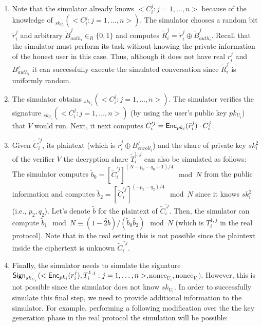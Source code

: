 \documentclass[journal]{IEEEtran}
\begin{document}
\begin{enumerate}

\item Note that the simulator already knows $<C_i^j:j=1,\ldots,n>$ because of the knowledge of $_{sk_{U_i}}(<C_i^j:j=1,\ldots,n>)$. The simulator chooses a random bit $\tilde{r}_i^j$ and arbitrary $\tilde{B}^j_{auth_i}  \in_R \{0,1\}$ and computes $\tilde{R}_i^j = \tilde{r}_i^j \oplus \tilde{B}^j_{auth_i}$. Recall that the simulator must perform its task without knowing the private information of the honest user in this case. Thus, although it does not have real $r_i^j$ and $B^j_{auth_i}$ it can successfully execute the simulated conversation since $\tilde{R}_i^j$ is uniformly random.

\item The simulator obtains $_{sk_{U_i}}(<C_i^j:j=1,\ldots,n>)$. The simulator verifies the signature $_{sk_{U_i}}(<C_i^j:j=1,\ldots,n>)$ (by using the user's public key $pk_{U_i}$) that $V$ would run. Next, it next computes $\tilde{C}^{\prime j}_{i} = \text{\sf Enc}_{pk_i}(\tilde{r}_i^j) \cdot C_i^j$. 

\item Given $\tilde{C}^{\prime j}_{i}$, its plaintext (which is $\tilde{r}_i^j \oplus B^j_{enroll_i}$) and the share of private key $sk_i^2$ of the verifier $V$ the decryption share $\tilde{T}_i^{1,j}$ can also be simulated as follows: The simulator computes $\tilde{b}_0= [\tilde{C}^{\prime j}_{i}]^{{(N -p_0 -q_0 +1)}/4} \mod N$ from the public information and computes $\tilde{b}_2 = [\tilde{C}^{\prime j}_{i}]^{{(-p_2-q_2)}/4} \mod N$ since it knows $sk_i^2$ (i.e., $p_2, q_2$). Let's denote $\tilde{b}$ for the plaintext of $\tilde{C}^{\prime j}_{i}$. Then, the simulator can compute $\tilde{b}_1 \mod N \equiv (1- \tilde{2b})/(\tilde{b}_0 \tilde{b_2}) \mod N$ (which is $T_i^{1,j}$ in the real protocol). Note that in the real setting this is not possible since the plaintext inside the ciphertext is unknown $\tilde{C}^{\prime \prime j}_{i}$.

\item Finally, the simulator needs to simulate the signature $\text{\sf Sign}_{sk_{U_i}}(<\text{\sf Enc}_{pk_i}(r^{j}_{i}),T^{1,j}_{i}:j =1, \ldots, n>, $nonce$_{U_i}, $nonce$_{V_i})$. However, this is not possible since the simulator does not know $sk_{U_i}$. In order to successfully simulate this final step, we need to provide additional information to the simulator. For example, performing a following modification over the the key generation phase in the real protocol the simulation will be possible: 


\end{enumerate}
\end{document}
